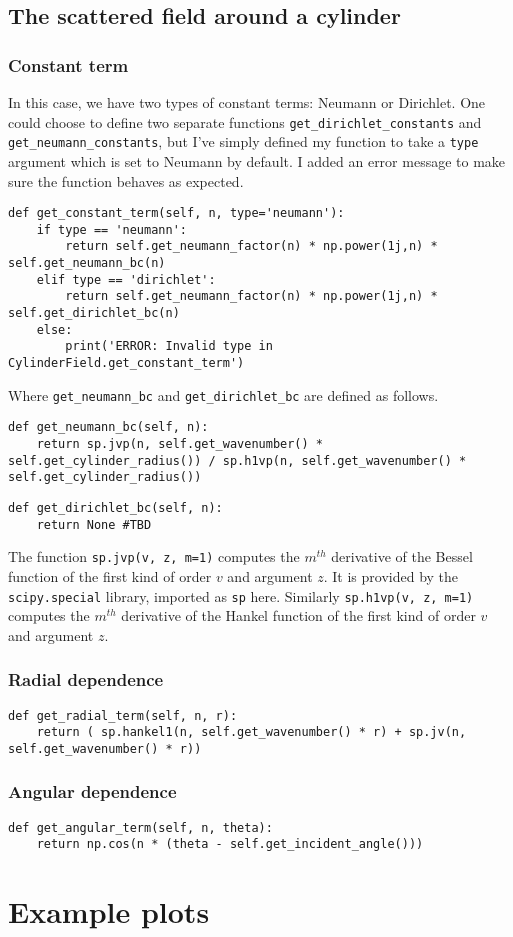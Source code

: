 \subsection{The scattered field around a cylinder}
%
\subsubsection{Constant term}
In this case, we have two types of constant terms: Neumann or Dirichlet. One could choose to define two separate functions \verb!get_dirichlet_constants! and \verb!get_neumann_constants!, but I've simply defined my function to take a \verb!type! argument which is set to Neumann by default. I added an error message to make sure the function behaves as expected.
%
  \begin{lstlisting}
def get_constant_term(self, n, type='neumann'):
    if type == 'neumann':
        return self.get_neumann_factor(n) * np.power(1j,n) * self.get_neumann_bc(n)
    elif type == 'dirichlet':
        return self.get_neumann_factor(n) * np.power(1j,n) * self.get_dirichlet_bc(n)
    else:
        print('ERROR: Invalid type in CylinderField.get_constant_term') \end{lstlisting} \par
%
Where \verb!get_neumann_bc! and \verb!get_dirichlet_bc! are defined as follows.
%
  \begin{lstlisting}
def get_neumann_bc(self, n):
    return sp.jvp(n, self.get_wavenumber() * self.get_cylinder_radius()) / sp.h1vp(n, self.get_wavenumber() * self.get_cylinder_radius()) \end{lstlisting} \par
%
  \begin{lstlisting}
def get_dirichlet_bc(self, n):
    return None #TBD \end{lstlisting}\par
%
The function \verb!sp.jvp(v, z, m=1)! computes the $m^{th}$ derivative of the Bessel function of the first kind of order $v$ and argument $z$. It is provided by the \verb!scipy.special! library, imported as \verb!sp! here. Similarly \verb!sp.h1vp(v, z, m=1)! computes the $m^{th}$ derivative of the Hankel function of the first kind of order $v$ and argument $z$.

\subsubsection{Radial dependence}
%
  \begin{lstlisting}
def get_radial_term(self, n, r):
    return ( sp.hankel1(n, self.get_wavenumber() * r) + sp.jv(n, self.get_wavenumber() * r))\end{lstlisting}
%
\subsubsection{Angular dependence}
%
  \begin{lstlisting}
def get_angular_term(self, n, theta):
    return np.cos(n * (theta - self.get_incident_angle()))\end{lstlisting}
%
\section{Example plots}
